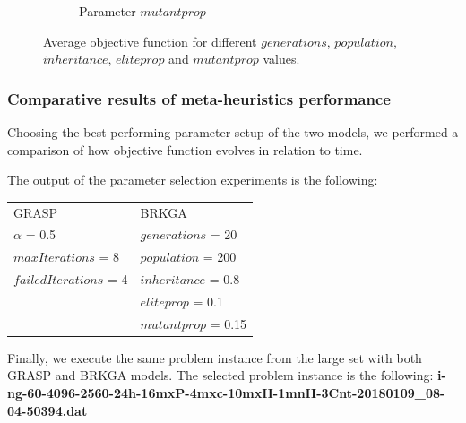 \begin{figure}[H]
\begin{subfigure}[b]{.49\linewidth}
\caption{Parameter $mutantprop$ }\label{fig2e}
\end{subfigure}%
\caption{Average objective function for different  $generations$,  $population$,  $inheritance$,  $eliteprop$ and  $mutantprop$ values.  }
\label{fig_brkga_params}
\end{figure}





\subsubsection{Comparative results of meta-heuristics performance}

Choosing the best performing parameter setup of the two models, we performed a comparison of how objective function evolves in relation to time.

The output of the parameter selection experiments is the following: 


\begin{tabular}{ll}
GRASP &  BRKGA \\
 $\alpha$ = 0.5  &  $generations$ = 20 \\
 $maxIterations$ = 8 &  $population$ = 200 \\
 $failedIterations$ = 4 & $inheritance$ = 0.8 \\
 						&  $eliteprop$ = 0.1 \\
 						& $mutantprop$ = 0.15 \\


\end{tabular}

Finally, we execute the same problem instance from the large set with both GRASP and BRKGA models. The selected problem instance is the following: \textbf{i-ng-60-4096-2560-24h-16mxP-4mxc-10mxH-1mnH-3Cnt-20180109\_08-04-50394.dat }



